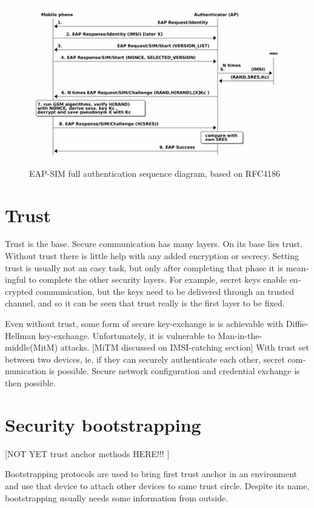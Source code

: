 \documentclass[12pt,a4paper,english]{tutthesis}
\begin{document}
\begin{otherlanguage}{english}
\begin{figure}[htb]
\centering
\includegraphics[width=.9\linewidth]{eap-sim-full.png}
\caption{\label{fig:eap-sim-full}EAP-SIM full authentication sequence diagram, based on RFC4186}
\end{figure}
\section{Trust}
\label{sec-2-6}

Trust is the base.
Secure communication has many layers. On its base lies trust. Without
trust there is little help with any added encryption or
secrecy. Setting trust is usually not an easy task, but only after
completing that phase it is meaningful to complete the other security
layers.
For example, secret keys enable encrypted communication, but the keys need to be
delivered through an trusted channel, and so it can be seen that trust
really is the first layer to be fixed. 



Even without trust, some form of secure key-exchange is is achievable
with Diffie-Hellman key-exchange\cite{diffie1976new}. Unfortunately, it is vulnerable
to Man-in-the-middle(MitM) attacks.  [MiTM discussed on IMSI-catching section]
With trust set between two devices, ie. if they can securely
authenticate each other, secret communication is possible. 
Secure network configuration and credential exchange is then possible.


\section{Security bootstrapping}
\label{sec-2-7}

[NOT YET trust anchor methods HERE!!! ]

Bootstrapping protocols are used to bring first trust anchor in an
environment and use that device to attach other devices to same trust
circle. Despite its name, bootstrapping usually needs some information
from outside. 



\end{otherlanguage}
\end{document}
